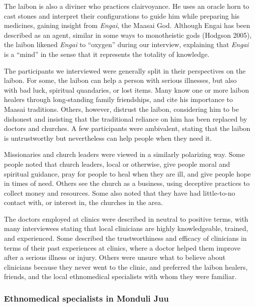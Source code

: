 \documentclass[
  11pt,
]{article}
\begin{document}
The laibon is also a diviner who practices clairvoyance. He uses an oracle horn to cast stones and interpret their configurations to guide him while preparing his medicines, gaining insight from \emph{Engai}, the Maasai God. Although Engai has been described as an agent, similar in some ways to monotheistic gods (Hodgson 2005), the laibon likened \emph{Engai} to ``oxygen'' during our interview, explaining that \emph{Engai} is a ``mind'' in the sense that it represents the totality of knowledge.

The participants we interviewed were generally split in their perspectives on the laibon. For some, the laibon can help a person with serious illnesses, but also with bad luck, spiritual quandaries, or lost items. Many know one or more laibon healers through long-standing family friendships, and cite his importance to Maasai traditions. Others, however, distrust the laibon, considering him to be dishonest and insisting that the traditional reliance on him has been replaced by doctors and churches. A few participants were ambivalent, stating that the laibon is untrustworthy but nevertheless can help people when they need it.

Missionaries and church leaders were viewed in a similarly polarizing way. Some people noted that church leaders, local or otherwise, give people moral and spiritual guidance, pray for people to heal when they are ill, and give people hope in times of need. Others see the church as a business, using deceptive practices to collect money and resources. Some also noted that they have had little-to-no contact with, or interest in, the churches in the area.

The doctors employed at clinics were described in neutral to positive terms, with many interviewees stating that local clinicians are highly knowledgeable, trained, and experienced. Some described the trustworthiness and efficacy of clinicians in terms of their past experiences at clinics, where a doctor helped them improve after a serious illness or injury. Others were unsure what to believe about clinicians because they never went to the clinic, and preferred the laibon healers, friends, and the local ethnomedical specialists with whom they were familiar.

\hypertarget{ethnomedical-specialists-in-monduli-juu}{%
\subsubsection{Ethnomedical specialists in Monduli Juu}\label{ethnomedical-specialists-in-monduli-juu}}
\end{document}
